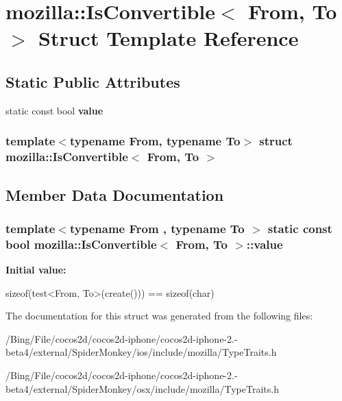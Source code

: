 \hypertarget{structmozilla_1_1_is_convertible}{\section{mozilla\-:\-:Is\-Convertible$<$ From, To $>$ Struct Template Reference}
\label{structmozilla_1_1_is_convertible}
}
\subsection*{Static Public Attributes}
\begin{DoxyCompactItemize}
\item 
static const bool {\bfseries value}
\end{DoxyCompactItemize}
\subsubsection*{template$<$typename From, typename To$>$ struct mozilla\-::\-Is\-Convertible$<$ From, To $>$}



\subsection{Member Data Documentation}
\hypertarget{structmozilla_1_1_is_convertible_ae2d3dc621a6a970099d4996ae9429a23}{
\subsubsection[{value}]{\setlength{\rightskip}{0pt plus 5cm}template$<$typename From , typename To $>$ static const bool {\bf mozilla\-::\-Is\-Convertible}$<$ From, To $>$\-::value}}\label{structmozilla_1_1_is_convertible_ae2d3dc621a6a970099d4996ae9429a23}
{\bfseries Initial value\-:}
\begin{DoxyCode}

      sizeof(test<From, To>(create())) == sizeof(char)
\end{DoxyCode}


The documentation for this struct was generated from the following files\-:\begin{DoxyCompactItemize}
\item 
/\-Bing/\-File/cocos2d/cocos2d-\/iphone/cocos2d-\/iphone-\/2.-\/beta4/external/\-Spider\-Monkey/ios/include/mozilla/Type\-Traits.\-h\item 
/\-Bing/\-File/cocos2d/cocos2d-\/iphone/cocos2d-\/iphone-\/2.-\/beta4/external/\-Spider\-Monkey/osx/include/mozilla/Type\-Traits.\-h\end{DoxyCompactItemize}
